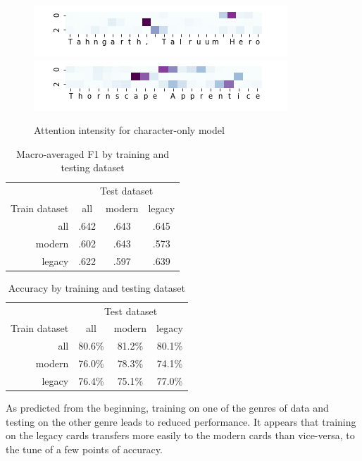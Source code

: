 \documentclass[letterpaper]{article} %
\begin{document}
\begin{figure}
  \includegraphics[width=.5\textwidth]{tahngarth-attention-char}
  \includegraphics[width=.5\textwidth]{thornscape-attention-char}
  \caption{Attention intensity for character-only model}
\end{figure}

\begin{table}
  \centering
  \caption{Macro-averaged F1 by training and testing dataset}
  \begin{tabular}{r | c | c | c}
    & \multicolumn{3}{c}{Test dataset}\\
    \cline{2-4}
    Train dataset & all & modern & legacy \\
    \hline
    all    & .642 & .643 & .645 \\
    modern & .602 & .643 & .573 \\
    legacy & .622 & .597 & .639 \\
  \end{tabular}
\end{table}

\begin{table}
  \centering
  \caption{Accuracy by training and testing dataset}
  \begin{tabular}{r | c | c | c}
    & \multicolumn{3}{c}{Test dataset}\\
    \cline{2-4}
    Train dataset & all & modern & legacy \\
    \hline
    all    & 80.6\% & 81.2\% & 80.1\% \\
    modern & 76.0\% & 78.3\% & 74.1\% \\
    legacy & 76.4\% & 75.1\% & 77.0\% \\
  \end{tabular}
\end{table}

As predicted from the beginning,
training on one of the genres of data
and testing on the other genre leads to reduced performance.
It appears that training on the legacy cards
transfers more easily to the modern cards
than vice-versa,
to the tune of a few points of accuracy.
\end{document}
